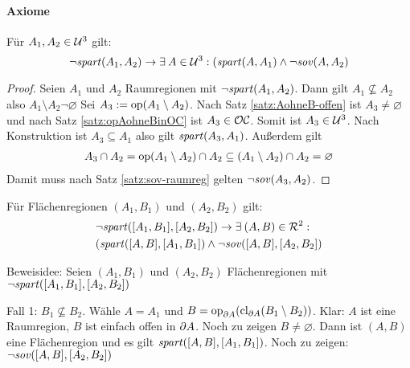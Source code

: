 
\paragraph{Axiome}

    \begin{satz}
        Für $A_1,A_2 \in \mathcal{U}^3$ gilt: 
        $$\neg \mathit{spart}(A_1,A_2) \to \exists\: A \in  \mathcal{U}^3: (\mathit{spart}(A,A_1) \wedge \neg \mathit{sov}(A,A_2)$$
    \end{satz}
    
    \begin{proof}
        Seien $A_1$ und $A_2$ Raumregionen mit $\neg \mathit{spart}(A_1,A_2)$.
        Dann gilt $A_1 \nsubseteq A_2$ also $A_1 \setminus A_2 \neg \varnothing$
        Sei $A_3 := \text{op}(A_1 \setminus A_2)$.
        Nach Satz \ref{satz:AohneB-offen} ist $A_3 \neq \varnothing$ und nach Satz \ref{satz:opAohneBinOC} ist $A_3 \in \mathcal{OC}$.
        Somit ist $A_3 \in \mathcal{U}^3$.
        Nach Konstruktion ist $A_3 \subseteq A_1$ also gilt $\mathit{spart}(A_3,A_1)$.
        Außerdem gilt
        \begin{align*}
            A_3 \cap A_2 
            = \text{op}(A_1 \setminus A_2) \cap A_2 
            \subseteq (A_1 \setminus A_2) \cap A_2 
            = \varnothing
        \end{align*}
        Damit muss nach Satz \ref{satz:sov-raumreg} gelten $\neg \mathit{sov}(A_3,A_2)$.
    \end{proof}
    
    
    \begin{hyp}
        Für Flächenregionen $(A_1,B_1)$ und $(A_2,B_2)$ gilt: 
        \begin{align*}
            &\neg \mathit{spart}([A_1,B_1],[A_2,B_2]) \to \exists\: (A,B) \in  \mathcal{R}^2:\\
            &(\mathit{spart}([A,B],[A_1,B_1]) \wedge \neg \mathit{sov}([A,B],[A_2,B_2])
        \end{align*}
    \end{hyp}
    
    Beweisidee: 
    Seien $(A_1,B_1)$ und $(A_2,B_2)$ Flächenregionen mit $\neg \mathit{spart}([A_1,B_1],[A_2,B_2])$
    
    Fall 1: $B_1 \nsubseteq B_2$. 
        Wähle $A = A_1$ und $B = \text{op}_{\partial A}(\text{cl}_{\partial A}(B_1 \setminus B_2))$.
        Klar: $A$ ist eine Raumregion, $B$ ist einfach offen in $\partial A$.
        Noch zu zeigen $B \neq \varnothing$.
        Dann ist $(A,B)$ eine Flächenregion und es gilt $\mathit{spart}([A,B],[A_1,B_1])$.
        Noch zu zeigen: $\neg \mathit{sov}([A,B],[A_2,B_2])$
    
